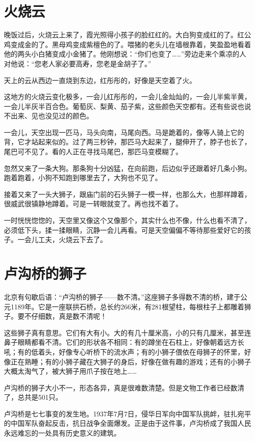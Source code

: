 \documentclass[12pt,UTF-8,openany]{ctexbook}
\begin{document}
\chapter{火烧云}

\begin{large}
    
    晚饭过后，火烧云上来了，霞光照得小孩子的脸红红的。大白狗变成红的了。红公鸡变成金的了。黑母鸡变成紫檀色的了。喂猪的老头儿在墙根靠着，笑盈盈地看着他的两头小白猪变成小金猪了。他刚想说：“你们也变了……”旁边走来个乘凉的人对他说：“您老人家必要高寿，您老是金胡子了。”
    
    天上的云从西边一直烧到东边，红彤彤的，好像是天空着了火。
    
    这地方的火烧云变化极多，一会儿红彤彤的，一会儿金灿灿的，一会儿半紫半黄，一会儿半灰半百合色。葡萄灰、梨黄、茄子紫，这些颜色天空都有。还有些说也说不出来、见也没见过的颜色。
    
    一会儿，天空出现一匹马，马头向南，马尾向西。马是跪着的，像等人骑上它的背，它才站起来似的。过了两三秒钟，那匹马大起来了，腿伸开了，脖子也长了，尾巴可不见了。看的人正在寻找马尾巴，那匹马变模糊了。
    
    忽然又来了一条大狗。那条狗十分凶猛，在向前跑，后边似乎还跟着好几条小狗。跑着跑着，小狗不知跑到哪里去了，大狗也不见了。
    
    接着又来了一头大狮子，跟庙门前的石头狮子一模一样，也那么大，也那样蹲着，很威武很镇静地蹲着。可是一转眼就变了。再也找不着了。
    
    一时恍恍惚惚的，天空里又像这个又像那个，其实什么也不像，什么也看不清了，必须低下头，揉一揉眼睛，沉静一会儿再看。可是天空偏偏不等待那些爱好它的孩子。一会儿工夫，火烧云下去了。
    
\end{large}



\chapter{卢沟桥的狮子}

\begin{large}
    
    北京有句歇后语：“卢沟桥的狮子——数不清。”这座狮子多得数不清的桥，建于公元1189年。它是一座联拱石桥，总长约266米，有281根望柱，每根柱子上都雕着狮子。要不仔细数，真是数不清呢！
    
    这些狮子真有意思。它们有大有小。大的有几十厘米高，小的只有几厘米，甚至连鼻子眼睛都看不清。它们的形状各不相同：有的蹲坐在石柱上，好像朝着远方长吼；有的低着头，好像专心听桥下的流水声；有的小狮子偎依在母狮子的怀里，好像正在熟睡；有的小狮子藏在大狮子的身后，好像在做有趣的游戏；还有的小狮子大概太淘气了，被大狮子用爪子按在地上……
    
    卢沟桥的狮子大小不一，形态各异，真是很难数清楚。但是文物工作者已经数清了，总共是501只。
    
    卢沟桥是七七事变的发生地。1937年7月7日，侵华日军向中国军队挑衅，驻扎宛平的中国军队奋起反击，抗日战争全面爆发。正是由于这件事，卢沟桥成了我国人民永远难忘的一处具有历史意义的建筑。
    
\end{large}
\end{document}

